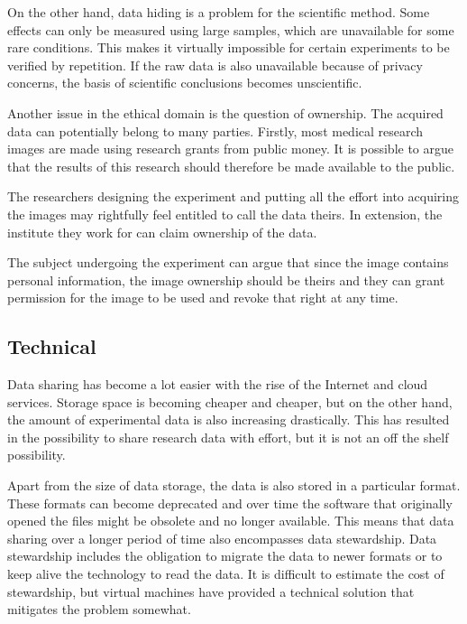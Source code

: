 On the other hand, data hiding is a problem for the scientific
method. Some effects can only be measured using large samples, which
are unavailable for some rare conditions. This makes it virtually
impossible for certain experiments to be verified by repetition. If
the raw data is also unavailable because of privacy concerns, the
basis of scientific conclusions becomes unscientific.

Another issue in the ethical domain is the question of ownership. The
acquired data can potentially belong to many parties. Firstly, most
medical research images are made using research grants from public
money. It is possible to argue that the results of this research
should therefore be made available to the public.

The researchers designing the experiment and putting all the effort
into acquiring the images may rightfully feel entitled to call the
data theirs. In extension, the institute they work for can claim
ownership of the data.

The subject undergoing the experiment can argue that since the image
contains personal information, the image ownership should be theirs
and they can grant permission for the image to be used and revoke that
right at any time.

\subsection{Technical}

Data sharing has become a lot easier with the rise of the Internet and
cloud services. Storage space is becoming cheaper and cheaper, but on
the other hand, the amount of experimental data is also increasing
drastically. This has resulted in the possibility to share research
data with effort, but it is not an off the shelf possibility.

Apart from the size of data storage, the data is also stored in a
particular format. These formats can become deprecated and over time
the software that originally opened the files might be obsolete and no
longer available. This means that data sharing over a longer period of
time also encompasses data stewardship. Data stewardship includes the
obligation to migrate the data to newer formats or to keep alive the
technology to read the data. It is difficult to estimate the cost of
stewardship, but virtual machines have provided a technical solution
that mitigates the problem somewhat.
